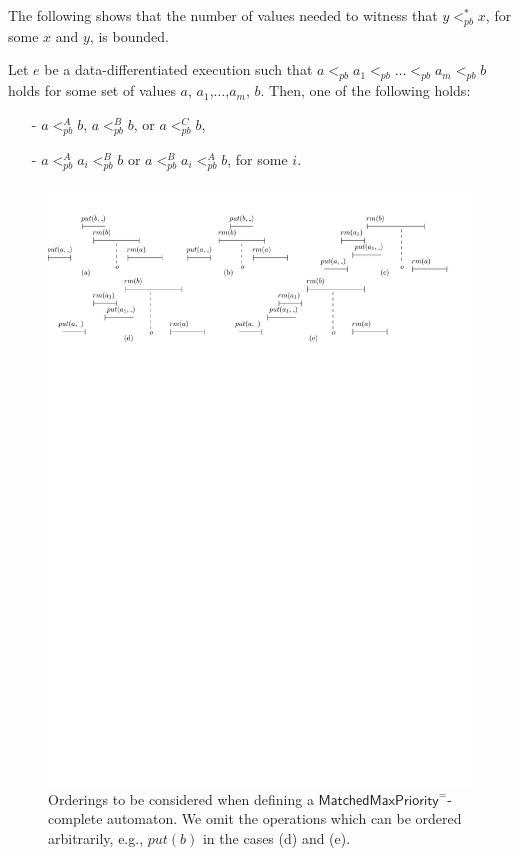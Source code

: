 \documentclass[a4paper,UKenglish]{lipics-v2016}
\begin{document}
The following shows that the number of values needed to witness that $y <_{\textit{pb}}^* x$, for some $x$ and $y$, is bounded.

\begin{lemma}
\label{lemma:ob order has bounded length}
Let $e$ be a data-differentiated execution such that $a <_{\textit{pb}} a_1 <_{\textit{pb}} \ldots <_{\textit{pb}} a_m <_{\textit{pb}} b$ holds for some set of values $a$, $a_1$,$\ldots$,$a_m$, $b$. Then, one of the following holds:
\begin{itemize}
\item[-] $a <_{\textit{pb}}^A b$, $a <_{\textit{pb}}^B b$, or $a <_{\textit{pb}}^C b$,

\item[-] $a <_{\textit{pb}}^A a_i <_{\textit{pb}}^B b$ or $a <_{\textit{pb}}^B a_i <_{\textit{pb}}^A b$, for some $i$.
\end{itemize}
\end{lemma}

\begin{figure}[t]
  \centering
  \includegraphics[width=0.8 \textwidth]{PIC-HIS-FiveEnumerations.pdf}
  \caption{Orderings to be considered when defining a $\mathsf{MatchedMaxPriority}^=$-complete automaton. We omit the operations which can be ordered arbitrarily, e.g., $\textit{put}(b)$ in the cases (d) and (e).}
  \label{fig:five enumerations}
\end{figure}
\end{document}
